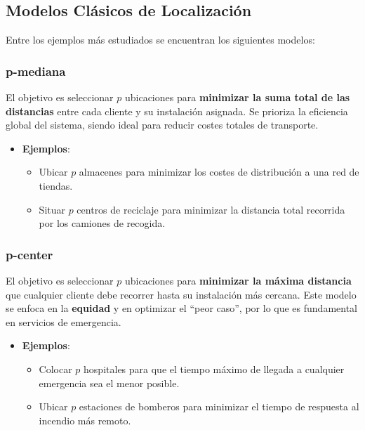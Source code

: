 \documentclass[12pt,a4paper]{book}
\begin{document}
\hrulefill

\subsection*{Modelos Clásicos de Localización}

Entre los ejemplos más estudiados se encuentran los siguientes modelos:

\subsubsection{p-mediana}
El objetivo es seleccionar $p$ ubicaciones para \textbf{minimizar la suma total de las distancias} entre cada cliente y su instalación asignada. Se prioriza la eficiencia global del sistema, siendo ideal para reducir costes totales de transporte.
\begin{itemize}
    \item \textbf{Ejemplos}:
    \begin{itemize}
        \item Ubicar $p$ almacenes para minimizar los costes de distribución a una red de tiendas.
        \item Situar $p$ centros de reciclaje para minimizar la distancia total recorrida por los camiones de recogida.
    \end{itemize}
\end{itemize}

\subsubsection{p-center}
El objetivo es seleccionar $p$ ubicaciones para \textbf{minimizar la máxima distancia} que cualquier cliente debe recorrer hasta su instalación más cercana. Este modelo se enfoca en la \textbf{equidad} y en optimizar el ``peor caso'', por lo que es fundamental en servicios de emergencia.
\begin{itemize}
    \item \textbf{Ejemplos}:
    \begin{itemize}
        \item Colocar $p$ hospitales para que el tiempo máximo de llegada a cualquier emergencia sea el menor posible.
        \item Ubicar $p$ estaciones de bomberos para minimizar el tiempo de respuesta al incendio más remoto.
    \end{itemize}
\end{itemize}
\end{document}

